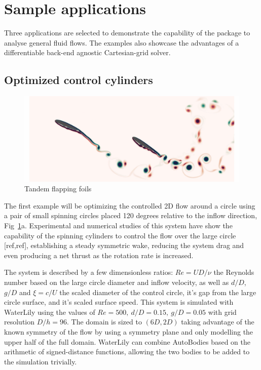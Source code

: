 \documentclass[final,3p,times]{elsarticle}
\begin{document}
\section{Sample applications}\label{sec:applications}
Three applications are selected to demonstrate the capability of the package to analyse general fluid flows. The examples also showcase the advantages of a differentiable back-end agnostic Cartesian-grid solver.

\subsection{Optimized control cylinders}

\begin{figure}
    \includegraphics[width=\linewidth]{img/tandem.png}
    \caption{Tandem flapping foils}
    \label{fig:spinning_circle}
\end{figure}

The first example will be optimizing the controlled 2D flow around a circle using a pair of small spinning circles placed 120 degrees relative to the inflow direction, Fig~\ref{fig:spinning_circle}a. Experimental and numerical studies of this system have show the capability of the spinning cylinders to control the flow over the large circle [ref,ref], establishing a steady symmetric wake, reducing the system drag and even producing a net thrust as the rotation rate is increased.

The system is described by a few dimensionless ratios: $Re=UD/\nu$ the Reynolds number based on the large circle diameter and inflow velocity, as well as $d/D$, $g/D$ and $\xi=c/U$ the scaled diameter of the control circle, it's gap from the large circle surface, and it's scaled surface speed. This system is simulated with WaterLily using the values of $Re=500,\ d/D=0.15,\ g/D=0.05$ with grid resolution $D/h=96$. The domain is sized to $(6D,2D)$ taking advantage of the known symmetry of the flow by using a symmetry plane and only modelling the upper half of the full domain. WaterLily can combine AutoBodies based on the arithmetic of signed-distance functions, allowing the two bodies to be added to the simulation trivially.
\end{document}
